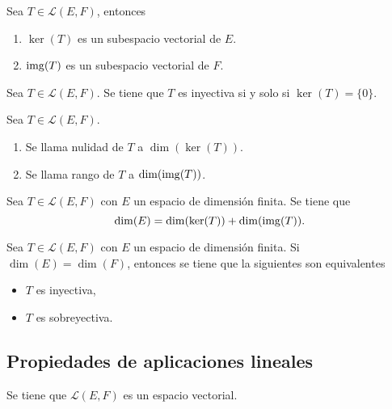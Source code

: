 \documentclass[a4,11pt]{aleph-notas}
\begin{document}
\begin{teo}
    Sea $T \in \mathcal{L}(E,F)$, entonces
    \begin{enumerate}
    \item 
        $\ker(T)$ es un subespacio vectorial de $E$.
    \item 
        $\operatorname{img}(T)$ es un subespacio vectorial de $F$.
    \end{enumerate}
\end{teo}
    
\begin{teo}
    Sea $T \in \mathcal{L}(E,F)$. Se tiene que $T$ es inyectiva si y solo si $\ker(T)=\{0\}$.
\end{teo}

\begin{defi}
    Sea $T \in \mathcal{L}(E,F)$.
    \begin{enumerate}
    \item 
        Se llama nulidad de $T$ a $\dim(\ker(T))$.
    \item 
        Se llama rango de $T$ a $\dim(\operatorname{img}(T))$.
    \end{enumerate}
\end{defi}

\begin{teo}
    Sea $T \in \mathcal{L}(E,F)$ con $E$ un espacio de dimensión finita. Se tiene que
    \[
        \dim(E) = \dim(\ker(T)) +  \dim(\operatorname{img}(T)).
    \]
\end{teo}   

\begin{teo}
    Sea $T \in \mathcal{L}(E,F)$ con $E$ un espacio de dimensión finita. Si $\dim(E)=\dim(F)$, entonces se tiene que la siguientes son equivalentes
    \begin{itemize}
        \item $T$ es inyectiva,
        \item $T$ es sobreyectiva.
    \end{itemize}
\end{teo}   

\subsection{Propiedades de aplicaciones lineales}

\begin{teo}
    Se tiene que $\mathcal{L}(E,F)$ es un espacio vectorial.
\end{teo}
\end{document}
